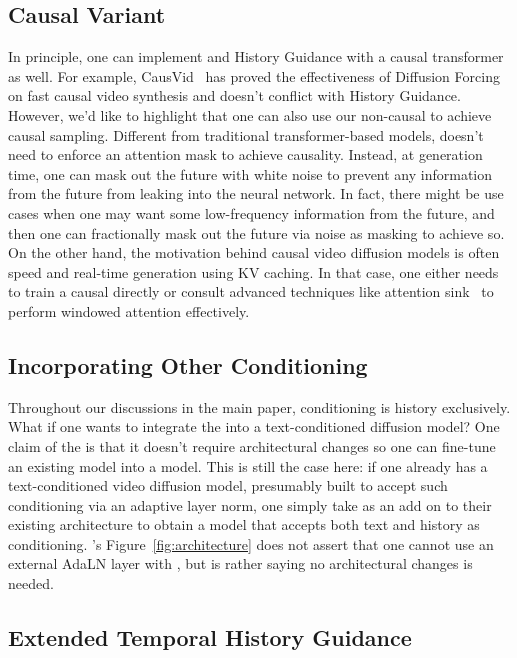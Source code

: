\subsection{Causal Variant}
In principle, one can implement \mtd and History Guidance with a causal transformer as well. For example, CausVid~\cite{yin2024slow} has proved the effectiveness of Diffusion Forcing on fast causal video synthesis and doesn't conflict with History Guidance. However, we'd like to highlight that one can also use our non-causal \mtd to achieve causal sampling. Different from traditional transformer-based models, \mtd doesn't need to enforce an attention mask to achieve causality. Instead, at generation time, one can mask out the future with white noise to prevent any information from the future from leaking into the neural network. In fact, there might be use cases when one may want some low-frequency information from the future, and then one can fractionally mask out the future via noise as masking to achieve so. On the other hand, the motivation behind causal video diffusion models is often speed and real-time generation using KV caching. In that case, one either needs to train a causal \mtd directly or consult advanced techniques like attention sink~\cite{xiao2023efficient} to perform windowed attention effectively.

\subsection{Incorporating Other Conditioning}
Throughout our discussions in the main paper, conditioning is history exclusively. What if one wants to integrate the \method into a text-conditioned diffusion model? One claim of the \mtd is that it doesn't require architectural changes so one can fine-tune an existing model into a \mtd model. This is still the case here: if one already has a text-conditioned video diffusion model, presumably built to accept such conditioning via an adaptive layer norm, one simply take \mtd as an add on to their existing architecture to obtain a \mtd model that accepts both text and history as conditioning. \mtd's Figure~\ref{fig:architecture} does not assert that one cannot use an external AdaLN layer with \mtd, but is rather saying no architectural changes is needed.

\subsection{Extended Temporal History Guidance}
\label{app:method_details_temporal}

